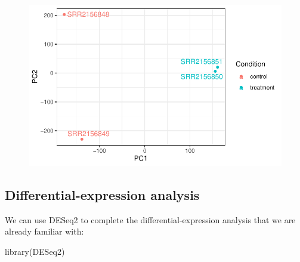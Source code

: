 \documentclass[
  letterpaper,
  DIV=11,
  numbers=noendperiod]{scrartcl}
\newenvironment{Shaded}{\begin{snugshade}}{\end{snugshade}}
\newcommand{\AttributeTok}[1]{\textcolor[rgb]{0.40,0.45,0.13}{#1}}
\newcommand{\DecValTok}[1]{\textcolor[rgb]{0.68,0.00,0.00}{#1}}
\newcommand{\FunctionTok}[1]{\textcolor[rgb]{0.28,0.35,0.67}{#1}}
\newcommand{\NormalTok}[1]{\textcolor[rgb]{0.00,0.23,0.31}{#1}}
\newcommand{\OtherTok}[1]{\textcolor[rgb]{0.00,0.23,0.31}{#1}}
\newcommand{\SpecialCharTok}[1]{\textcolor[rgb]{0.37,0.37,0.37}{#1}}
\newcommand{\StringTok}[1]{\textcolor[rgb]{0.13,0.47,0.30}{#1}}
\begin{document}
\begin{figure}[H]

{\centering \includegraphics{class_16_files/figure-pdf/unnamed-chunk-9-1.pdf}

}

\end{figure}

\hypertarget{differential-expression-analysis}{%
\subsection{Differential-expression
analysis}\label{differential-expression-analysis}}

We can use DESeq2 to complete the differential-expression analysis that
we are already familiar with:

\begin{Shaded}
\begin{Highlighting}[]
\FunctionTok{library}\NormalTok{(DESeq2)}
\end{Highlighting}
\end{Shaded}

\begin{Shaded}
\end{Shaded}
\end{document}
